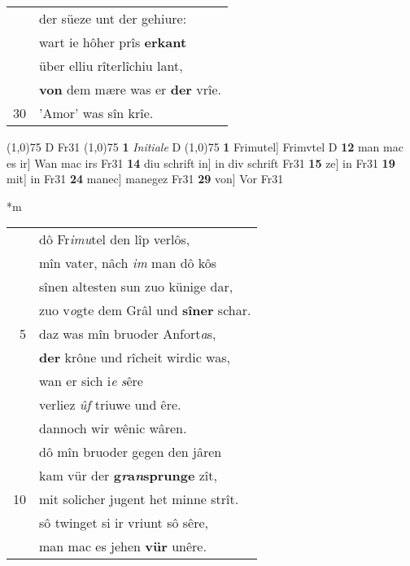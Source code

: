 \documentclass[8pt,a4paper,notitlepage]{article}
\begin{document}
\begin{table}[ht]
\begin{minipage}[t]{0.5\linewidth}
\begin{tabular}{rl}
 & der süeze unt der gehiure:\\ 
 & wart ie hôher prîs \textbf{erkant}\\ 
 & über elliu rîterlîchiu lant,\\ 
 & \textbf{von} dem mære was er \textbf{der} vrîe.\\ 
30 & 'Amor' was sîn krîe.\\ 
\end{tabular}
\scriptsize
\line(1,0){75} \newline
D Fr31 \newline
\line(1,0){75} \newline
\textbf{1} \textit{Initiale} D  \newline
\line(1,0){75} \newline
\textbf{1} Frimutel] Frimvtel D \textbf{12} man mac es ir] Wan mac irs Fr31 \textbf{14} diu schrift in] in div schrift Fr31 \textbf{15} ze] in Fr31 \textbf{19} mit] in Fr31 \textbf{24} manec] manegez Fr31 \textbf{29} von] Vor Fr31 \newline
\end{minipage}
\hspace{0.5cm}
\begin{minipage}[t]{0.5\linewidth}
\small
\begin{center}*m
\end{center}
\begin{tabular}{rl}
 & dô Fr\textit{imu}tel den lîp verlôs,\\ 
 & mîn vater, nâch \textit{im} man dô kôs\\ 
 & sînen altesten sun zuo künige dar,\\ 
 & zuo v\textit{o}gte dem Grâl und \textbf{sîner} schar.\\ 
5 & daz was mîn bruoder Anfort\textit{a}s,\\ 
 & \textbf{der} krône und rîcheit wirdic was,\\ 
 & wan er sich i\textit{e} \textit{s}êre\\ 
 & verliez \textit{ûf} triuwe und êre.\\ 
 & dannoch wir wênic wâren.\\ 
 & dô mîn bruoder gegen den jâren\\ 
 & kam vür der \textbf{g\textit{r}a\textit{n}sprunge} zît,\\ 
10 & mit solicher jugent het minne strît.\\ 
 & sô twinget si ir vriunt sô sêre,\\ 
 & man mac es jehen \textbf{vür} unêre.\\ 

\end{tabular}
\end{minipage}
\end{table}
\end{document}
